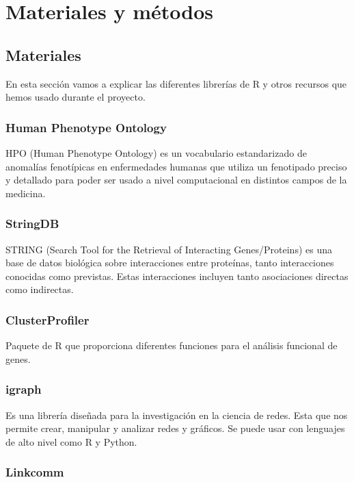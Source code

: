 \section{Materiales y métodos}

\subsection{Materiales}

En esta sección vamos a explicar las diferentes librerías de R y otros recursos que hemos usado durante el proyecto.

\subsubsection{Human Phenotype Ontology}

HPO (Human Phenotype Ontology)\cite{HPO} es un vocabulario estandarizado de anomalías fenotípicas en enfermedades humanas que utiliza un fenotipado preciso y detallado para poder ser usado a nivel computacional en distintos campos de la medicina.


\subsubsection{StringDB}

STRING (Search Tool for the Retrieval of Interacting Genes/Proteins) \cite{STRING} es una base de datos biológica sobre interacciones entre proteínas, tanto interacciones conocidas como previstas. Estas interacciones incluyen tanto asociaciones directas como indirectas.

\subsubsection{ClusterProfiler}

Paquete de R que proporciona diferentes funciones para el análisis funcional de genes.

\subsubsection{igraph}

Es una librería diseñada para la investigación en la ciencia de redes. Esta que nos permite crear, manipular y analizar redes y gráficos. Se puede usar con lenguajes de alto nivel como R y Python.

\subsubsection{Linkcomm}

